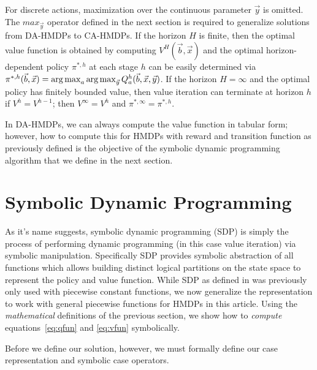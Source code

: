 \documentclass[twoside,11pt]{article}
\def\argmax{\operatornamewithlimits{arg\max}}
\begin{document}
For discrete actions, maximization over the continuous parameter $\vec{y}$ is omitted. The $max_{\vec{y}}$ operator defined in the next section is required to generalize solutions from DA-HMDPs to CA-HMDPs.
If the horizon $H$ is finite, then the optimal value function is
obtained by computing $V^H(\vec{b},\vec{x})$ and the optimal
horizon-dependent policy $\pi^{*,h}$ at each stage $h$ can be easily
determined via $\pi^{*,h}(\vec{b},\vec{x}) = \argmax_a
\argmax_{\vec{y}} Q^h_a(\vec{b},\vec{x},\vec{y})$.  If the horizon $H
= \infty$ and the optimal policy has finitely bounded value, then
value iteration can terminate at horizon $h$ if $V^{h} = V^{h-1}$;
then $V^\infty = V^h$ and $\pi^{*,\infty} = \pi^{*,h}$.

In DA-HMDPs, we can always compute the value function in tabular form;
however, how to compute this for HMDPs with reward and transition
function as previously defined is the objective of the symbolic
dynamic programming algorithm that we define in the next section.

\section{Symbolic Dynamic Programming} \label{SDP}
As it's name suggests, symbolic dynamic programming (SDP) \cite{fomdp}
is simply the process of performing dynamic programming (in this case
value iteration) via symbolic manipulation. Specifically SDP provides symbolic abstraction of all functions which allows building distinct logical partitions on the state space to represent the policy and value function. While SDP as defined
in \cite{fomdp} was previously only used with piecewise
constant functions, we now generalize the representation to work with
general piecewise functions for HMDPs in this article. Using the \emph{mathematical} definitions of the previous section, we  
show how to \emph{compute} equations~\eqref{eq:qfun} and \eqref{eq:vfun} 
symbolically.

Before we define our solution, however, we must formally define our
case representation and symbolic case operators.
\end{document}
